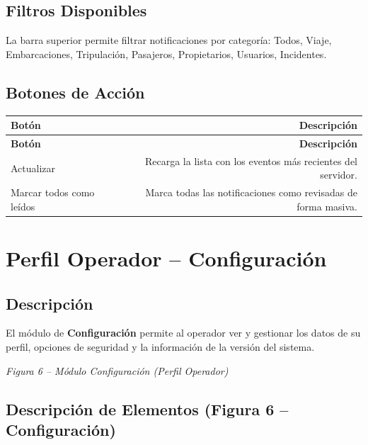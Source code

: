 \documentclass[12pt,a4paper]{article}
\begin{document}
\subsection{Filtros Disponibles}

La barra superior permite filtrar notificaciones por categoría: Todos, Viaje, Embarcaciones, Tripulación, Pasajeros, Propietarios, Usuarios, Incidentes.

\subsection{Botones de Acción}

\begin{longtable}{LR}
  \toprule
  \textbf{Botón} & \textbf{Descripción} \\
  \midrule
  \endfirsthead
  \toprule
  \textbf{Botón} & \textbf{Descripción} \\
  \midrule
  \endhead
  \bottomrule
  \endfoot
  Actualizar               & Recarga la lista con los eventos más recientes del servidor. \\[4pt]
  Marcar todos como leídos & Marca todas las notificaciones como revisadas de forma masiva. \\
\end{longtable}

\section{Perfil Operador -- Configuración}

\subsection{Descripción}

El módulo de \textbf{Configuración} permite al operador ver y gestionar los datos de su perfil, opciones de seguridad y la información de la versión del sistema.

\textit{Figura 6 -- Módulo Configuración (Perfil Operador)}

\subsection{Descripción de Elementos (Figura 6 -- Configuración)}
\end{document}
